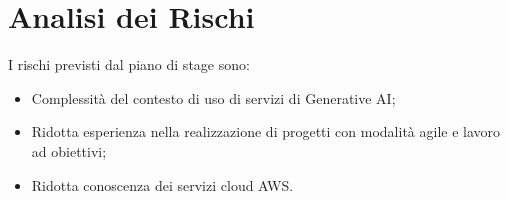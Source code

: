 \section*{Analisi dei Rischi}
I rischi previsti dal piano di stage sono:
\begin{itemize}
    \item Complessità del contesto di uso di servizi di Generative AI;
    \item Ridotta esperienza nella realizzazione di progetti con modalità agile e lavoro ad obiettivi;
    \item Ridotta conoscenza dei servizi cloud AWS.
\end{itemize}
